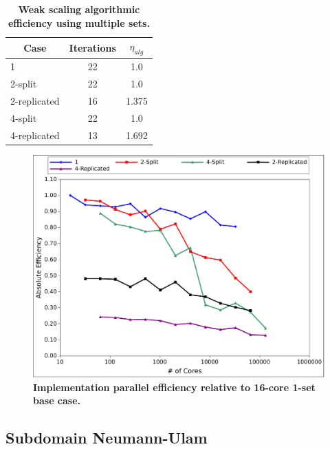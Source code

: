 \begin{table}[h!]
  \begin{center}
    \begin{tabular}{lcc}\hline\hline
      \multicolumn{1}{c}{Case}& 
      \multicolumn{1}{c}{Iterations}&
      \multicolumn{1}{c}{$\eta_{alg}$} \\\hline
      1 & 22 & 1.0 \\
      2-split & 22 & 1.0 \\
      2-replicated & 16 & 1.375 \\
      4-split & 22 & 1.0 \\
      4-replicated & 13 & 1.692 \\
      \hline\hline
    \end{tabular}
  \end{center}
  \caption{\textbf{Weak scaling algorithmic efficiency using multiple
      sets.}}
  \label{tab:ms_weak_alg_eff}
\end{table}

\begin{figure}[t!]
  \begin{center}
    \includegraphics[width=6in]{chapters/parallel_mc/titan_weak_ms_impeff.pdf}
  \end{center}
  \caption{\textbf{Implementation parallel efficiency relative to 16-core
      1-set base case.}}
  \label{fig:titan_weak_ms_impeff}
\end{figure}

\clearpage

\subsection{Subdomain Neumann-Ulam}
\label{subsec:full_clip}

